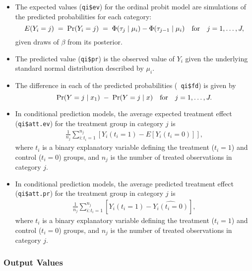 \begin{itemize}
\item The expected values ({\tt qi\$ev}) for the ordinal probit model
  are simulations of the predicted probabilities for each category:
\begin{equation*}
    E(Y_i = j) \; = \; \Pr(Y_i = j) \; = \; \Phi(\tau_{j} \mid \mu_i)
    - \Phi(\tau_{j-1} \mid  \mu_i) \quad {\rm for} \quad j=1,\dots,J, 
\end{equation*}
given draws of $\beta$ from its posterior.
  
\item The predicted value ({\tt qi\$pr}) is the observed value of
  $Y_i$ given the underlying standard normal distribution described by
  $\mu_i$.

\item The difference in each of the predicted probabilities ({\tt
    qi\$fd}) is given by
  \begin{equation*}
    \Pr(Y=j \mid x_1) \;-\; \Pr(Y=j \mid x) \quad {\rm for} \quad
    j=1,\dots,J.
  \end{equation*}

\item In conditional prediction models, the average expected treatment effect
(\texttt{qi\$att.ev}) for the treatment group in category $j$ is
\begin{eqnarray*}
\frac{1}{n_j}\sum_{i:t_{i}=1}^{n_j}[Y_{i}(t_{i}=1)-E[Y_{i}(t_{i}=0)]],
\end{eqnarray*}
where $t_{i}$ is a binary explanatory variable defining the treatment
($t_{i}=1$) and control ($t_{i}=0$) groups, and $n_j$ is the 
number of treated observations in category $j$.

\item In conditional prediction models, the average predicted treatment effect
(\texttt{qi\$att.pr}) for the treatment group in category $j$ is
\begin{eqnarray*}
\frac{1}{n_j}\sum_{i:t_{i}=1}^{n_j}[Y_{i}(t_{i}=1)-\widehat{Y_{i}(t_{i}=0)}],
\end{eqnarray*}
where $t_{i}$ is a binary explanatory variable defining the treatment
($t_{i}=1$) and control ($t_{i}=0$) groups, and $n_j$ is the 
number of treated observations in category $j$.

\end{itemize}

\subsubsection{Output Values}


